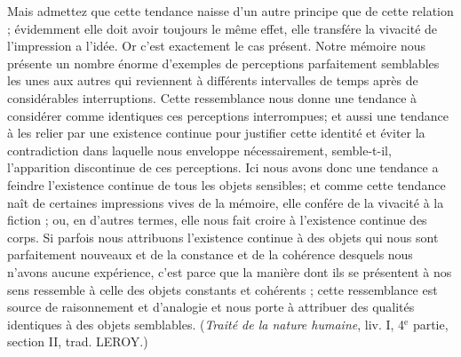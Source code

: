 Mais admettez que cette tendance naisse d’un autre
principe que de cette relation ; évidemment elle doit avoir
toujours le même effet, elle transfére la vivacité de l'impression
a l’idée. Or c’est exactement le cas présent. Notre
mémoire nous présente un nombre énorme d’exemples
de perceptions parfaitement semblables les unes aux
autres qui reviennent à différents intervalles de temps
après de considérables interruptions. Cette ressemblance
nous donne une tendance à considérer comme identiques
ces perceptions interrompues; et aussi une tendance à
les relier par une existence continue pour justifier cette
identité et éviter la contradiction dans laquelle nous
enveloppe nécessairement, semble-t-il, l'apparition discontinue
de ces perceptions. Ici nous avons donc une
tendance a feindre l’existence continue de tous les objets
sensibles; et comme cette tendance naît de certaines
impressions vives de la mémoire, elle confére de la vivacité
à la fiction ; ou, en d’autres termes, elle nous fait croire à
l'existence continue des corps. Si parfois nous attribuons
l'existence continue à des objets qui nous sont parfaitement
nouveaux et de la constance et de la cohérence
desquels nous n’avons aucune expérience, c’est parce
que la manière dont ils se présentent à nos sens ressemble
à celle des objets constants et cohérents ; cette ressemblance
est source de raisonnement et d’analogie et nous
porte à attribuer des qualités identiques à des objets
semblables. ({\it Traité de la nature humaine}, liv. I, 4$^\text{e}$ partie,
section II, trad. L{\footnotesize EROY}.)

